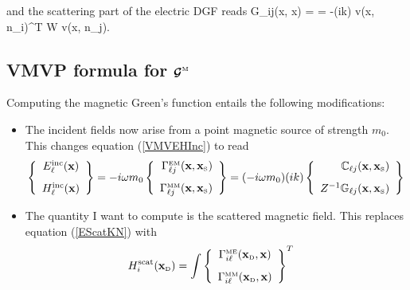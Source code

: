 \documentclass[letterpaper]{article}
\begin{document}
and the scattering part of the electric DGF reads
{
 \mc G_{ij}(\vb x, \vb x)
= 
= -(ik) \vb v(\vb x, \vbhat n_{i})^T \vb W
        \vb v(\vb x, \vbhat n_{j}).
}

\subsection*{VMVP formula for $\boldsymbol{\mathcal{G}}^{\hbox{\tiny{M}}}$}

Computing the magnetic Green's function entails the following
modifications:
\begin{itemize}
 \item The incident fields now arise from a point magnetic source
       of strength $m_0$. This changes equation (\ref{VMVEHInc})
       to read
$$
 \left\{\begin{array}{c}
 E_\ell^{\hbox{\scriptsize{inc}}}(\mathbf{x}) \\[8pt]
 H_\ell^{\hbox{\scriptsize{inc}}}(\mathbf{x})
 \end{array}\right\}
= -i\omega m_0
  \left\{\begin{array}{r}
   \Gamma_{\ell j}^{\hbox{\tiny{EM}}}(\mathbf{x}, \mathbf{x}_{\hbox{\tiny{S}}}) \\[8pt]
   \Gamma_{\ell j}^{\hbox{\tiny{MM}}}(\mathbf{x}, \mathbf{x}_{\hbox{\tiny{S}}})
  \end{array}\right\}
= (-i\omega m_0) (ik)
  \left\{\begin{array}{r}
        \mathbb{C}_{\ell j}(\mathbf{x}, \mathbf{x}_{\hbox{\tiny{S}}}) \\[8pt]
  Z^{-1}\mathbb{G}_{\ell j}(\mathbf{x}, \mathbf{x}_{\hbox{\tiny{S}}})
  \end{array}\right\}
$$
 \item The quantity I want to compute is the scattered magnetic
       field. This replaces equation (\ref{EScatKN}) with
\begin{align}
 H_i\sups{scat}(\vb x\subt{D})
&=\int 
  \left\{\begin{array}{c}
   \Gamma_{i \ell}\supt{ME}(\vb x\subt{D}, \vb x) 
   \\[8pt]
   \Gamma_{i \ell}\supt{MM}(\vb x\subt{D}, \vb x) 
  \end{array}\right\}^T

\end{align}
\end{itemize}
\end{document}
